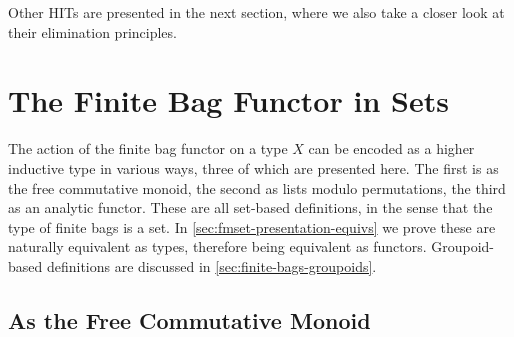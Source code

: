 \documentclass[final,a4paper,USenglish,cleveref]{lipics-v2021}
\begin{document}
Other HITs are presented in the next section, where we also take a closer look at their elimination principles.



\section{The Finite Bag Functor in Sets}\label{sec:finite-bags-sets}

The action of the finite bag functor on a type $X$ can be encoded as a higher inductive
type in various ways, three of which are presented here.
The first is as the free commutative monoid, the second as lists modulo permutations, the third as an analytic functor.
These are all set-based definitions, in the sense that the type of finite bags is a set.
In \cref{sec:fmset-presentation-equivs} we prove these are naturally equivalent as types,
therefore being equivalent as functors.
Groupoid-based definitions are discussed in \cref{sec:finite-bags-groupoids}.

\subsection{As the Free Commutative Monoid}
\end{document}
